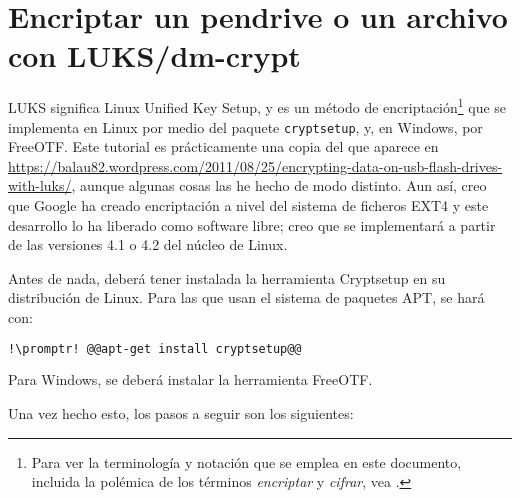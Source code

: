 \section{Encriptar un pendrive o un archivo con LUKS/dm-crypt}\label{sec:luks}
LUKS significa \foreignlanguage{english}{Linux Unified Key Setup}, y es un método de encriptación\footnote{Para
ver la terminología y notación que se emplea en este documento, incluida la polémica de los términos
\emph{encriptar} y \emph{cifrar}, vea .} que se implementa en Linux por medio del paquete
\lstinline!cryptsetup!, y, en Windows, por FreeOTF. Este tutorial es prácticamente una copia del que aparece en
\url{https://balau82.wordpress.com/2011/08/25/encrypting-data-on-usb-flash-drives-with-luks/}, aunque algunas
cosas las he hecho de modo distinto. Aun así, creo que Google ha creado encriptación a nivel del sistema de
ficheros EXT4 y este desarrollo lo ha liberado como software libre; creo que se implementará a partir de las
versiones 4.1 o 4.2 del núcleo de Linux.

Antes de nada, deberá tener instalada la herramienta Cryptsetup en su distribución de Linux. Para las que usan
el sistema de paquetes APT, se hará con:

\begin{lstlisting}[gobble=2,language=bash,style=bashinteract,escapechar=!]
  !\promptr! @@apt-get install cryptsetup@@
\end{lstlisting}

\noindent Para Windows, se deberá instalar la herramienta FreeOTF.

Una vez hecho esto, los pasos a seguir son los siguientes:

